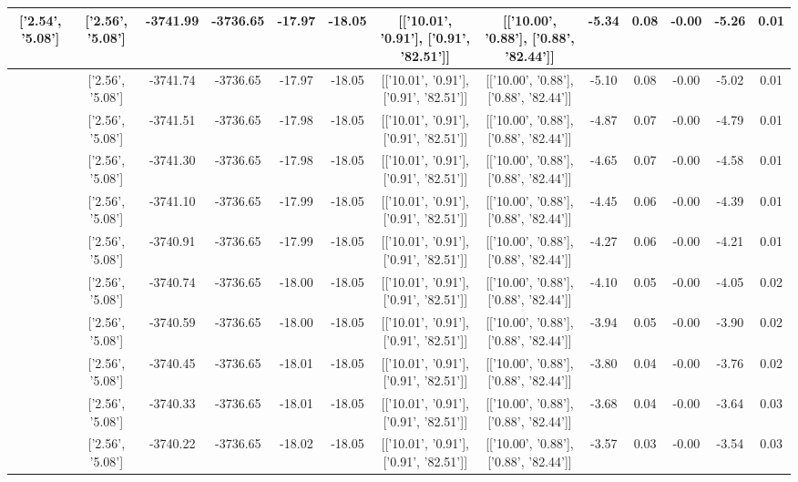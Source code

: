 \begin{table}[htbp]
\begin{adjustbox}{angle=90}
\begin{tabular}{|c|c|c|c|c|c|c|c|c|c|c|c|c|}
 ['2.54', '5.08'] & ['2.56', '5.08'] & -3741.99 & -3736.65 & -17.97 & -18.05 & [['10.01', '0.91'], ['0.91', '82.51']] & [['10.00', '0.88'], ['0.88', '82.44']] & -5.34 & 0.08 & -0.00 & -5.26 & 0.01\\ \hline
 ['2.54', '5.08'] & ['2.56', '5.08'] & -3741.74 & -3736.65 & -17.97 & -18.05 & [['10.01', '0.91'], ['0.91', '82.51']] & [['10.00', '0.88'], ['0.88', '82.44']] & -5.10 & 0.08 & -0.00 & -5.02 & 0.01\\ \hline
 ['2.55', '5.08'] & ['2.56', '5.08'] & -3741.51 & -3736.65 & -17.98 & -18.05 & [['10.01', '0.91'], ['0.91', '82.51']] & [['10.00', '0.88'], ['0.88', '82.44']] & -4.87 & 0.07 & -0.00 & -4.79 & 0.01\\ \hline
 ['2.55', '5.08'] & ['2.56', '5.08'] & -3741.30 & -3736.65 & -17.98 & -18.05 & [['10.01', '0.91'], ['0.91', '82.51']] & [['10.00', '0.88'], ['0.88', '82.44']] & -4.65 & 0.07 & -0.00 & -4.58 & 0.01\\ \hline
 ['2.55', '5.08'] & ['2.56', '5.08'] & -3741.10 & -3736.65 & -17.99 & -18.05 & [['10.01', '0.91'], ['0.91', '82.51']] & [['10.00', '0.88'], ['0.88', '82.44']] & -4.45 & 0.06 & -0.00 & -4.39 & 0.01\\ \hline
 ['2.55', '5.08'] & ['2.56', '5.08'] & -3740.91 & -3736.65 & -17.99 & -18.05 & [['10.01', '0.91'], ['0.91', '82.51']] & [['10.00', '0.88'], ['0.88', '82.44']] & -4.27 & 0.06 & -0.00 & -4.21 & 0.01\\ \hline
 ['2.55', '5.08'] & ['2.56', '5.08'] & -3740.74 & -3736.65 & -18.00 & -18.05 & [['10.01', '0.91'], ['0.91', '82.51']] & [['10.00', '0.88'], ['0.88', '82.44']] & -4.10 & 0.05 & -0.00 & -4.05 & 0.02\\ \hline
 ['2.55', '5.08'] & ['2.56', '5.08'] & -3740.59 & -3736.65 & -18.00 & -18.05 & [['10.01', '0.91'], ['0.91', '82.51']] & [['10.00', '0.88'], ['0.88', '82.44']] & -3.94 & 0.05 & -0.00 & -3.90 & 0.02\\ \hline
 ['2.55', '5.08'] & ['2.56', '5.08'] & -3740.45 & -3736.65 & -18.01 & -18.05 & [['10.01', '0.91'], ['0.91', '82.51']] & [['10.00', '0.88'], ['0.88', '82.44']] & -3.80 & 0.04 & -0.00 & -3.76 & 0.02\\ \hline
 ['2.55', '5.08'] & ['2.56', '5.08'] & -3740.33 & -3736.65 & -18.01 & -18.05 & [['10.01', '0.91'], ['0.91', '82.51']] & [['10.00', '0.88'], ['0.88', '82.44']] & -3.68 & 0.04 & -0.00 & -3.64 & 0.03\\ \hline
 ['2.56', '5.08'] & ['2.56', '5.08'] & -3740.22 & -3736.65 & -18.02 & -18.05 & [['10.01', '0.91'], ['0.91', '82.51']] & [['10.00', '0.88'], ['0.88', '82.44']] & -3.57 & 0.03 & -0.00 & -3.54 & 0.03\\ \hline

\end{tabular}
\end{adjustbox}
\end{table}
